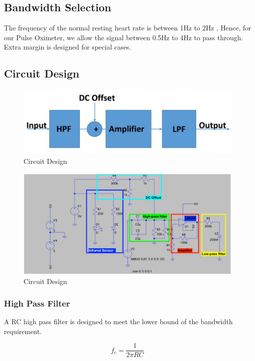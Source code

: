 \subsection{Bandwidth Selection}

The frequency of the normal resting heart rate is between 1Hz to 2Hz \cite{george8}. Hence, for our Pulse Oximeter, we allow the signal between 0.5Hz to 4Hz to pass through. Extra margin is designed for special cases.

\subsection{Circuit Design}

\begin{figure}[H]
	\centering
	\includegraphics[width=0.7\linewidth]{georgepic3.jpg}
	\caption{Circuit Design}
\end{figure}

\begin{figure}[H]
	\centering
	\includegraphics[width=0.9\linewidth]{georgepic4.jpg}
	\caption{Circuit Design}
\end{figure}

\subsubsection{High Pass Filter}

A RC high pass filter is designed to meet the lower bound of the bandwidth requirement.

\begin{equation}
	f_c = \frac{1}{2\pi RC}
\end{equation}

